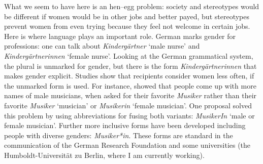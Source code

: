 What we seem to have here is an hen--egg problem: society and stereotypes would be different if women
would be in other jobs and better payed, but stereotypes prevent women from even trying because they
feel not welcome in certain jobs. Here is where language plays an important role. German marks
gender for professions: one can talk about \emph{Kindergärtner} `male nurse' and
\emph{Kindergärtnerinnen} `female nurse'. Looking at the German grammatical system, the plural is unmarked for
gender, but there is the form \emph{Kindergärtnerinnen} that makes gender explicit. Studies show
that recipients consider women less often, if the unmarked form is used. For instance, \citet{SSB2001a}
showed that people come up with more names of male musicians, when asked for their favorite \emph{Musiker} rather than
their favorite \emph{Musiker} `musician' or \emph{Musikerin} `female musician'. One proposal solved this
problem by using abbreviations for fusing both variants: \emph{MusikerIn} `male or female musician'. Further more inclusive
forms have been developed including people with diverse genders: \emph{Musiker*in}. These forms are
standard in the communication of the German Research Foundation and some universities (\eg the
Humboldt-Universität zu Berlin, where I am currently working).    

